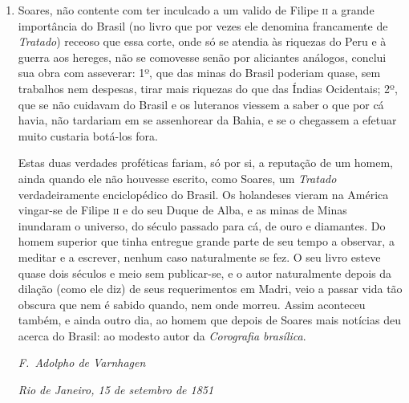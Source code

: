 \begin{enumerate}
\item  Soares, não contente com ter inculcado a um valido de Filipe \textsc{ii} a
grande importância do Brasil (no livro que por vezes ele denomina francamente 
de \textit{Tratado}) receoso que essa corte, onde só se atendia às riquezas
do Peru e à guerra aos hereges, não se comovesse senão por aliciantes análogos, 
conclui sua obra com asseverar: 1º, que das minas do Brasil poderiam
quase, sem trabalhos nem despesas, tirar mais riquezas do que das Índias
Ocidentais; 2º, que se não cuidavam do Brasil e os luteranos viessem a
saber o que por cá havia, não tardariam em se assenhorear da Bahia, e se	\EP[-1]
o chegassem a efetuar muito custaria botá-los fora.

Estas duas verdades proféticas 
fariam, só por si, a reputação de um homem, ainda 
quando ele não houvesse escrito, como Soares, um \textit{Tratado} verdadeiramente enciclopédico 
do Brasil. Os holandeses vieram na América vingar-se de Filipe \textsc{ii} e do seu Duque de 
Alba, e as minas de Minas inundaram o universo, do século passado para cá, de ouro e 
diamantes. Do homem superior que tinha entregue grande parte de seu tempo a observar, 
a meditar e a escrever, nenhum caso naturalmente se fez. O seu livro esteve quase dois 
séculos e meio sem publicar-se, e o autor naturalmente depois da dilação (como ele diz) de 
seus requerimentos em Madri, veio a passar vida tão obscura que nem é sabido quando, nem 
onde morreu. Assim aconteceu também, e ainda outro dia, ao homem que depois de Soares 
mais notícias deu acerca do Brasil: ao modesto autor da \textit{Corografia brasílica}.
\medskip

\indent\textit{F.~Adolpho de Varnhagen}  

\textit{Rio de Janeiro, 15 de setembro de 1851}\\
\end{enumerate}




